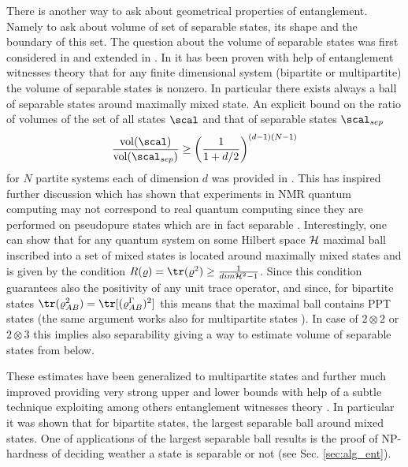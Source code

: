 \documentclass[twocolumn,aps,rmp]{revtex4}
\begin{document}
There is another way to ask about geometrical properties of
entanglement. Namely to ask about volume of set of separable states,
its shape and the boundary of this set. The question about the volume
of separable states was first considered in \cite{ZyczkowskiHSP-vol}
and extended in \cite{volume1}. In \cite{ZyczkowskiHSP-vol} it has
been proven with help of entanglement witnesses theory that for any
finite dimensional system (bipartite or multipartite) the volume of
separable states is nonzero. In particular there exists always a ball
of separable states around maximally mixed state. An explicit bound on
the ratio of volumes of the set of all states $\scal$ and that of
separable states $\scal_{sep}$
\begin{equation}
{\mathrm{vol}(\scal)\over \mathrm{vol}(\scal_{sep})}\geq \left({1\over 1+d/2}\right)^{(d-1)(N-1)}
\end{equation}
for $N$ partite systems each of dimension $d$ was provided in
\cite{VidalT1998-robustness}.  This has inspired further discussion
which has shown that experiments in NMR quantum computing may not
correspond to real quantum computing since they are performed on
pseudopure states which are in fact separable
\cite{BraunsteinCJLS1998-nmr}. Interestingly, one can show
\cite{ZyczkowskiHSP-vol,volume2} that for any quantum system on some
Hilbert space ${\cal H}$ maximal ball inscribed into a set of mixed
states is located around maximally mixed states and is given by the
condition $R(\varrho)={\tr}(\varrho^{2})\geq \frac{1}{dim{\cal H}^{2}
  -1}$. Since this condition guarantees also the positivity of any
unit trace operator, and since, for bipartite states
${\tr}(\varrho_{AB}^{2})={\tr}[(\varrho_{AB}^{\Gamma})^{2}]$ this
means that the maximal ball contains PPT states (the same argument
works also for multipartite states \cite{volume2}). In case of $2
\otimes 2$ or $2\otimes 3$ this implies also separability giving a way
to estimate volume of separable states from below.

These estimates have been generalized to multipartite states
\cite{BraunsteinCJLS1998-nmr} and further much improved providing very
strong upper and lower bounds with help of a subtle technique
exploiting among others entanglement witnesses theory
\cite{Gurvits1,Gurvits2,Gurvits3}.  In particular it was shown that
for bipartite states, the largest separable ball around mixed
states. One of applications of the largest separable ball results is
the proof of NP-hardness of deciding weather a state is separable or
not \cite{GurvitzNPHard} (see Sec. \ref{sec:alg_ent}).
\end{document}
